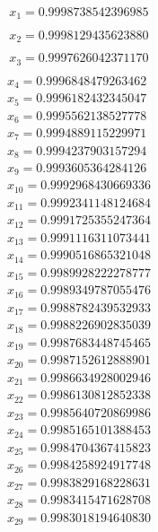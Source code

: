 \begin{multicols}{3}
	\begin{align*}
		x_{1}  = 0.9998738542396985\\
	\end{align*}
	\vfill
	\columnbreak
	\begin{align*}
		x_{2}  = 0.9998129435623880\\
	\end{align*}
	\vfill
	\columnbreak
	\begin{align*}
		x_{3}  = 0.9997626042371170\\
	\end{align*}
	\vfill
	\columnbreak
	\begin{align*}
		x_{4}  = 0.9996848479263462\\
		x_{5}  = 0.9996182432345047\\
		x_{6}  = 0.9995562138527778\\
		x_{7}  = 0.9994889115229971\\
		x_{8}  = 0.9994237903157294\\
		x_{9}  = 0.9993605364284126\\
		x_{10} = 0.9992968430669336\\
		x_{11} = 0.9992341148124684\\
		x_{12} = 0.9991725355247364\\
		x_{13} = 0.9991116311073441\\
		x_{14} = 0.9990516865321048\\
		x_{15} = 0.9989928222278777\\
		x_{16} = 0.9989349787055476\\
		x_{17} = 0.9988782439532933\\
		x_{18} = 0.9988226902835039\\
		x_{19} = 0.9987683448745465\\
		x_{20} = 0.9987152612888901\\
		x_{21} = 0.9986634928002946\\
		x_{22} = 0.9986130812852338\\
		x_{23} = 0.9985640720869986\\
		x_{24} = 0.9985165101388453\\
		x_{25} = 0.9984704367415823\\
		x_{26} = 0.9984258924917748\\
		x_{27} = 0.9983829168228631\\
		x_{28} = 0.9983415471628708\\
		x_{29} = 0.9983018194640830\\

\end{align*}
\end{multicols}
